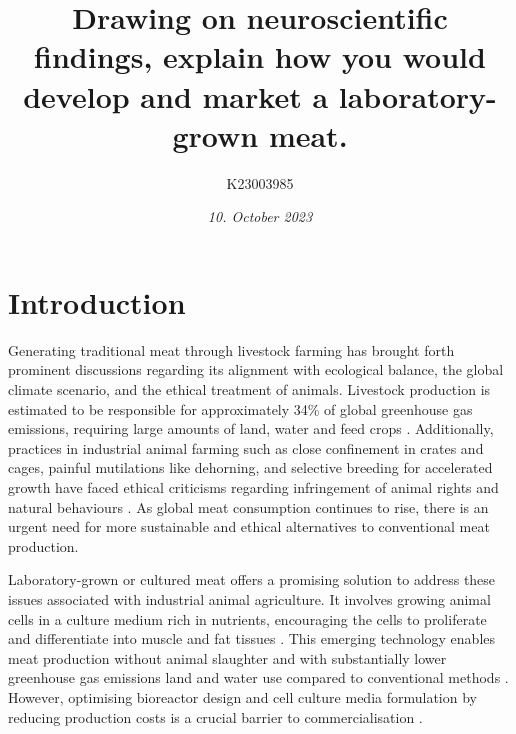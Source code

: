 \documentclass[10pt]{article}
\title{Drawing on neuroscientific findings, explain how you would develop and market a laboratory-grown meat.}
\author[ ]{K23003985}
\date{\textit{10. October 2023}}
\begin{document}

\maketitle

\doublespacing

\begin{sloppypar} %





  \section{Introduction}
  \label{sec:introduction}

  Generating traditional meat through livestock farming has brought forth prominent discussions regarding its alignment with ecological balance, the global climate scenario, and the ethical treatment of animals. Livestock production is estimated to be responsible for approximately 34\% of global greenhouse gas emissions, requiring large amounts of land, water and feed crops \citep{tuomisto_environmental_2011}. Additionally, practices in industrial animal farming such as close confinement in crates and cages, painful mutilations like dehorning, and selective breeding for accelerated growth have faced ethical criticisms regarding infringement of animal rights and natural behaviours \citep{stephens_bringing_2018}. As global meat consumption continues to rise, there is an urgent need for more sustainable and ethical alternatives to conventional meat production.

  Laboratory-grown or cultured meat offers a promising solution to address these issues associated with industrial animal agriculture. It involves growing animal cells in a culture medium rich in nutrients, encouraging the cells to proliferate and differentiate into muscle and fat tissues \citep{datar_possibilities_2010}. This emerging technology enables meat production without animal slaughter and with substantially lower greenhouse gas emissions land and water use compared to conventional methods \citep{tuomisto_environmental_2011}. However, optimising bioreactor design and cell culture media formulation by reducing production costs is a crucial barrier to commercialisation \citep{specht_opportunities_2018}.


\end{sloppypar}
\end{document}
